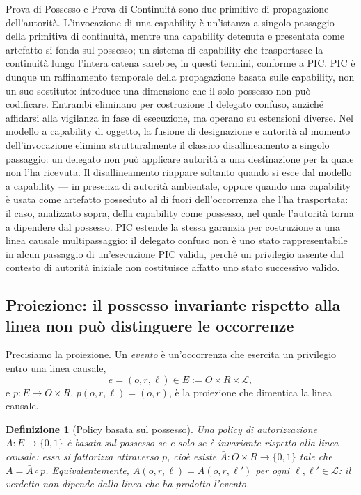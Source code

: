 \documentclass[11pt]{article}
\newtheorem{definition}{Definizione}
\begin{document}
Prova di Possesso e Prova di Continuità sono due primitive di propagazione
dell'autorità. L'invocazione di una capability è un'istanza a singolo passaggio
della primitiva di continuità, mentre una capability detenuta e presentata come
artefatto si fonda sul possesso; un sistema di capability che trasportasse la
continuità lungo l'intera catena sarebbe, in questi termini, conforme a PIC. PIC
è dunque un raffinamento temporale della propagazione basata sulle capability,
non un suo sostituto: introduce una dimensione che il solo possesso non può
codificare. Entrambi eliminano per costruzione il delegato confuso, anziché
affidarsi alla vigilanza in fase di esecuzione, ma operano su estensioni diverse.
Nel modello a capability di oggetto, la fusione di designazione e autorità al
momento dell'invocazione elimina strutturalmente il classico disallineamento a
singolo passaggio: un delegato non può applicare autorità a una destinazione per
la quale non l'ha ricevuta. Il disallineamento riappare soltanto quando si esce
dal modello a capability --- in presenza di autorità ambientale, oppure quando
una capability è usata come artefatto posseduto al di fuori dell'occorrenza che
l'ha trasportata: il caso, analizzato sopra, della capability come possesso, nel
quale l'autorità torna a dipendere dal possesso. PIC estende la stessa garanzia
per costruzione a una linea causale multipassaggio: il delegato confuso non è
uno stato rappresentabile in alcun passaggio di un'esecuzione PIC valida, perché
un privilegio assente dal contesto di autorità iniziale non costituisce affatto
uno stato successivo valido.

\subsection{Proiezione: il possesso invariante rispetto alla linea non può
distinguere le occorrenze}
\label{sec:impossibility}

Precisiamo la proiezione. Un \emph{evento} è un'occorrenza che esercita un
privilegio entro una linea causale,
\[
e = (o, r, \ell) \in E := O \times R \times \mathcal{L},
\]
e $p : E \to O \times R$, $p(o,r,\ell) = (o,r)$, è la proiezione che dimentica
la linea causale.

\begin{definition}[Policy basata sul possesso]
Una policy di autorizzazione $A : E \to \{0,1\}$ è \emph{basata sul possesso} se
e solo se è invariante rispetto alla linea causale: essa si fattorizza
attraverso $p$, cioè esiste $\bar{A} : O \times R \to \{0,1\}$ tale che
$A = \bar{A} \circ p$. Equivalentemente,
$A(o,r,\ell) = A(o,r,\ell')$ per ogni $\ell, \ell' \in \mathcal{L}$: il
verdetto non dipende dalla linea che ha prodotto l'evento.
\end{definition}
\end{document}
